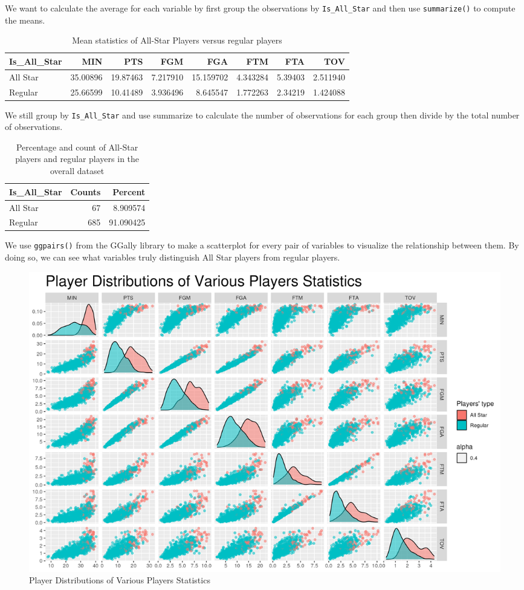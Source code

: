 \documentclass[
]{article}
\begin{document}
We want to calculate the average for each variable by first group the observations by \texttt{Is\_All\_Star} and then use \texttt{summarize()} to compute the means.

\begin{table}

\caption{\label{tab:table2}Mean statistics of All-Star Players versus regular players}
\centering
\begin{tabular}[t]{l|r|r|r|r|r|r|r}
\hline
Is\_All\_Star & MIN & PTS & FGM & FGA & FTM & FTA & TOV\\
\hline
All Star & 35.00896 & 19.87463 & 7.217910 & 15.159702 & 4.343284 & 5.39403 & 2.511940\\
\hline
Regular & 25.66599 & 10.41489 & 3.936496 & 8.645547 & 1.772263 & 2.34219 & 1.424088\\
\hline
\end{tabular}
\end{table}

We still group by \texttt{Is\_All\_Star} and use summarize to calculate the number of observations for each group then divide by the total number of observations.

\begin{table}

\caption{\label{tab:table3}Percentage and count of All-Star players and regular players in the overall dataset}
\centering
\begin{tabular}[t]{l|r|r}
\hline
Is\_All\_Star & Counts & Percent\\
\hline
All Star & 67 & 8.909574\\
\hline
Regular & 685 & 91.090425\\
\hline
\end{tabular}
\end{table}

We use \texttt{ggpairs()} from the GGally library to make a scatterplot for every pair of variables to visualize the relationship between them. By doing so, we can see what variables truly distinguish All Star players from regular players.

\begin{figure}
\includegraphics[width=0.8\linewidth]{results/stats_distributions} \caption{Player Distributions of Various Players Statistics}\label{fig:fig4}
\end{figure}
\end{document}
